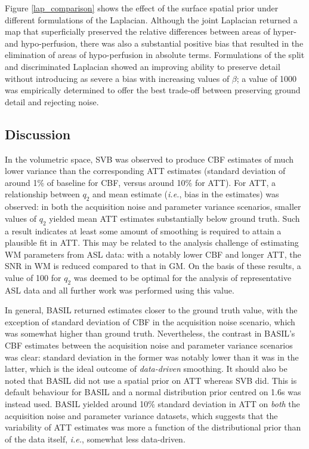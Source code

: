 Figure \ref{lap_comparison} shows the effect of the surface spatial prior under different formulations of the Laplacian. Although the joint Laplacian returned a map that superficially preserved the relative differences between areas of hyper- and hypo-perfusion, there was also a substantial positive bias that resulted in the elimination of areas of hypo-perfusion in absolute terms. Formulations of the split and discriminated Laplacian showed an improving ability to preserve detail without introducing as severe a bias with increasing values of $\beta$; a value of 1000 was empirically determined to offer the best trade-off between preserving ground detail and rejecting noise. 

\subsection{Discussion}

In the volumetric space, SVB was observed to produce CBF estimates of much lower variance than the corresponding ATT estimates (standard deviation of around 1\% of baseline for CBF, versus around 10\% for ATT). For ATT, a relationship between $q_2$ and mean estimate (\textit{i.e.}, bias in the estimates) was observed: in both the acquisition noise and parameter variance scenarios, smaller values of $q_2$ yielded mean ATT estimates substantially below ground truth. Such a result indicates at least some amount of smoothing is required to attain a plausible fit in ATT. This may be related to the analysis challenge of estimating WM parameters from ASL data: with a notably lower CBF and longer ATT, the SNR in WM is reduced compared to that in GM. On the basis of these results, a value of 100 for $q_2$ was deemed to be optimal for the analysis of representative ASL data and all further work was performed using this value. 

In general, BASIL returned estimates closer to the ground truth value, with the exception of standard deviation of CBF in the acquisition noise scenario, which was somewhat higher than ground truth. Nevertheless, the contrast in BASIL's CBF estimates between the acquisition noise and parameter variance scenarios was clear: standard deviation in the former was notably lower than it was in the latter, which is the ideal outcome of \textit{data-driven} smoothing. It should also be noted that BASIL did not use a spatial prior on ATT whereas SVB did. This is default behaviour for BASIL and a normal distribution prior centred on 1.6s was instead used. BASIL yielded around 10\% standard deviation in ATT on \textit{both} the acquisition noise and parameter variance datasets, which suggests that the variability of ATT estimates was more a function of the distributional prior than of the data itself, \textit{i.e.}, somewhat less data-driven. 

